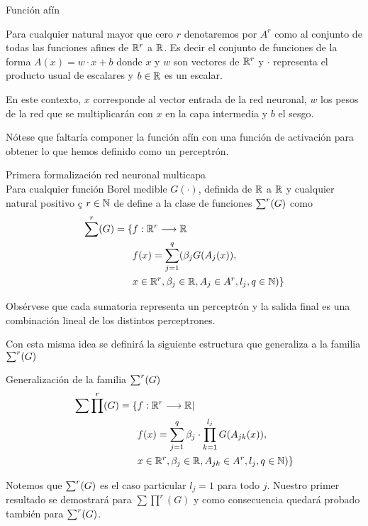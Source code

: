 \begin{definicion} Función afín

    Para cualquier natural mayor que cero $r$  denotaremos por $A^r$ como al conjunto de todas 
    las funciones afines de $\mathbb{R}^r$ a $\mathbb{R}$. Es decir el conjunto de funciones de la forma 
    $A(x) = w \cdot x + b$ donde $x$ y $w$ son vectores de $\mathbb{R}^r$ y $\cdot$ representa el producto 
    usual de escalares y $b \in \mathbb{R}$ es un escalar.  
    
\end{definicion}  

En este contexto, $x$ corresponde al vector entrada de la red neuronal, $w$ los pesos de la red
que se multiplicarán con $x$ en la capa intermedia y $b$ el sesgo. 

Nótese que faltaría componer la función afín con una función de activación para obtener lo que hemos definido 
como un perceptrón. 

\begin{definicion} Primera formalización red neuronal multicapa \\
    Para cualquier función Borel medible $G(\cdot)$, definida de $\mathbb{R}$ a $\mathbb{R}$ y cualquier natural positivo ç
    $r \in \mathbb{N}$ de define a la clase de funciones $\sum ^r (G)$ como 
    \begin{equation}
        \begin{split}
        \sum ^r (G) = 
        \{ 
            & f: \mathbb{R} ^r \longrightarrow \mathbb{R} \\
            &f(x)=\sum_{j = 1} ^q (
            \beta_j G(A_{j}(x)), \\
            & x  \in \mathbb{R} ^r, \beta_j \in \mathbb{R}, A_{j}\in A^r, l_j,q \in \mathbb{N}
            )
        \}
        \end{split}
    \end{equation}
\end{definicion}


Obsérvese que cada sumatoria representa un perceptrón y la salida final 
es una combinación lineal de los distintos perceptrones. 

Con esta misma idea se definirá la siguiente estructura que generaliza a la familia $\sum ^r (G)$  
   
\begin{definicion} Generalización de la familia $\sum ^r (G)$ \\
    
    \begin{equation} 
        \begin{split}
        \sum \prod^r(G) = \{ 
        &f: \mathbb{R}^r \longrightarrow \mathbb{R} | \\
        & f(x) = \sum_{j = 1} ^q  \beta_j \cdot \prod_{k=1}^{l_j}
        G(A_{jk}(x)), \\
        &x  \in \mathbb{R}^r, \beta_j \in \mathbb{R}, A_{jk}\in A^r, l_j,q \in \mathbb{N}
        )
        \}
    \end{split}
    \end{equation}  

    Notemos que $\sum ^r (G)$ es el caso particular $l_j = 1$ para todo $j$. Nuestro primer
    resultado se demostrará para $\sum \prod^r(G)$ y como consecuencia quedará probado
    también para $\sum ^r (G)$. 
\end{definicion}


